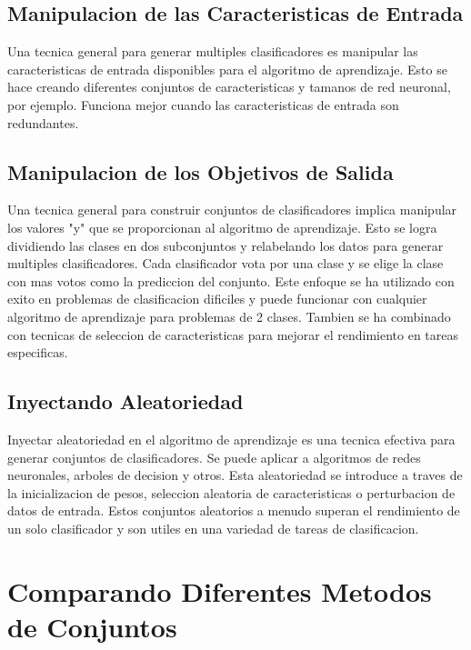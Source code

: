 \documentclass{esannV2}
\begin{document}
\subsection{Manipulacion de las Caracteristicas de Entrada}

Una tecnica general para generar multiples clasificadores es manipular las caracteristicas de entrada disponibles para el algoritmo de aprendizaje. Esto se hace creando diferentes conjuntos de caracteristicas y tamanos de red neuronal, por ejemplo. Funciona mejor cuando las caracteristicas de entrada son redundantes.

\subsection{Manipulacion de los Objetivos de Salida}

Una tecnica general para construir conjuntos de clasificadores implica manipular los valores "y" que se proporcionan al algoritmo de aprendizaje. Esto se logra dividiendo las clases en dos subconjuntos y relabelando los datos para generar multiples clasificadores. Cada clasificador vota por una clase y se elige la clase con mas votos como la prediccion del conjunto. Este enfoque se ha utilizado con exito en problemas de clasificacion dificiles y puede funcionar con cualquier algoritmo de aprendizaje para problemas de 2 clases. Tambien se ha combinado con tecnicas de seleccion de caracteristicas para mejorar el rendimiento en tareas especificas.

\subsection{Inyectando Aleatoriedad}

Inyectar aleatoriedad en el algoritmo de aprendizaje es una tecnica efectiva para generar conjuntos de clasificadores. Se puede aplicar a algoritmos de redes neuronales, arboles de decision y otros. Esta aleatoriedad se introduce a traves de la inicializacion de pesos, seleccion aleatoria de caracteristicas o perturbacion de datos de entrada. Estos conjuntos aleatorios a menudo superan el rendimiento de un solo clasificador y son utiles en una variedad de tareas de clasificacion.

\section{Comparando Diferentes Metodos de Conjuntos }
\end{document}
